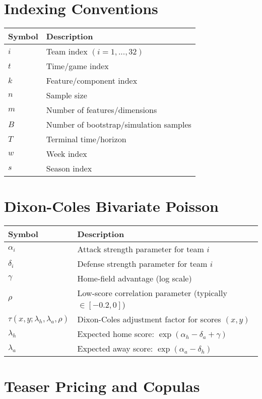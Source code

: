 \section*{Indexing Conventions}

\begin{tabular}{ll}
\toprule
\textbf{Symbol} & \textbf{Description} \\
\midrule
$i$ & Team index $(i = 1, ..., 32)$ \\
$t$ & Time/game index \\
$k$ & Feature/component index \\
$n$ & Sample size \\
$m$ & Number of features/dimensions \\
$B$ & Number of bootstrap/simulation samples \\
$T$ & Terminal time/horizon \\
$w$ & Week index \\
$s$ & Season index \\
\bottomrule
\end{tabular}

\section*{Dixon-Coles Bivariate Poisson}

\begin{tabular}{ll}
\toprule
\textbf{Symbol} & \textbf{Description} \\
\midrule
$\alpha_i$ & Attack strength parameter for team $i$ \\
$\delta_i$ & Defense strength parameter for team $i$ \\
$\gamma$ & Home-field advantage (log scale) \\
$\rho$ & Low-score correlation parameter (typically $\in [-0.2, 0]$) \\
$\tau(x,y;\lambda_h,\lambda_a,\rho)$ & Dixon-Coles adjustment factor for scores $(x,y)$ \\
$\lambda_h$ & Expected home score: $\exp(\alpha_h - \delta_a + \gamma)$ \\
$\lambda_a$ & Expected away score: $\exp(\alpha_a - \delta_h)$ \\
\bottomrule
\end{tabular}

\section*{Teaser Pricing and Copulas}


